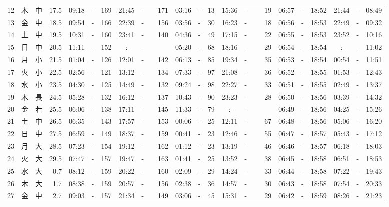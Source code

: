 \documentclass[12pt,a4j]{jsarticle}
\begin{document}
\begin{table}[htbp]
\begin{center}
{\begin{tabular}{|rc|cr|ccrccr|ccrccr|ccc|ccc|}
12 & 木 & 中 & 17.5 &  09:18 &-& 169 &  21:45 &-& 171 &  03:16 &-&  13 &  15:36 &-&  19 & 06:57 & -& 18:52 & 21:44 & -& 08:49 \\
13 & 金 & 中 & 18.5 &  09:54 &-& 166 &  22:39 &-& 156 &  03:56 &-&  30 &  16:23 &-&  18 & 06:56 & -& 18:53 & 22:49 & -& 09:32 \\
14 & 土 & 中 & 19.5 &  10:31 &-& 160 &  23:41 &-& 140 &  04:36 &-&  49 &  17:15 &-&  22 & 06:55 & -& 18:53 & 23:52 & -& 10:16 \\
15 & 日 & 中 & 20.5 &  11:11 &-& 152 &  --:-- &-&~~~~~ &  05:20 &-&  68 &  18:16 &-&  29 & 06:54 & -& 18:54 & --:-- & -& 11:02 \\
16 & 月 & 小 & 21.5 &  01:04 &-& 126 &  12:01 &-& 142 &  06:13 &-&  85 &  19:34 &-&  35 & 06:53 & -& 18:54 & 00:54 & -& 11:51 \\
17 & 火 & 小 & 22.5 &  02:56 &-& 121 &  13:12 &-& 134 &  07:33 &-&  97 &  21:08 &-&  36 & 06:52 & -& 18:55 & 01:53 & -& 12:43 \\
18 & 水 & 小 & 23.5 &  04:30 &-& 125 &  14:49 &-& 132 &  09:24 &-&  98 &  22:27 &-&  33 & 06:51 & -& 18:55 & 02:49 & -& 13:37 \\
19 & 木 & 長 & 24.5 &  05:28 &-& 132 &  16:12 &-& 137 &  10:43 &-&  90 &  23:23 &-&  28 & 06:50 & -& 18:56 & 03:39 & -& 14:32 \\
20 & 金 & 若 & 25.5 &  06:06 &-& 138 &  17:11 &-& 145 &  11:33 &-&  79 &  --:-- &-&~~~~~ & 06:49 & -& 18:56 & 04:25 & -& 15:26 \\
21 & 土 & 中 & 26.5 &  06:35 &-& 143 &  17:57 &-& 153 &  00:06 &-&  25 &  12:11 &-&  67 & 06:48 & -& 18:56 & 05:06 & -& 16:20 \\
22 & 日 & 中 & 27.5 &  06:59 &-& 149 &  18:37 &-& 159 &  00:41 &-&  23 &  12:46 &-&  55 & 06:47 & -& 18:57 & 05:43 & -& 17:12 \\
23 & 月 & 大 & 28.5 &  07:23 &-& 154 &  19:12 &-& 162 &  01:12 &-&  23 &  13:19 &-&  46 & 06:46 & -& 18:57 & 06:18 & -& 18:03 \\
24 & 火 & 大 & 29.5 &  07:47 &-& 157 &  19:47 &-& 163 &  01:41 &-&  25 &  13:52 &-&  38 & 06:45 & -& 18:58 & 06:51 & -& 18:53 \\
25 & 水 & 大 &  0.7 &  08:12 &-& 159 &  20:22 &-& 160 &  02:09 &-&  29 &  14:24 &-&  33 & 06:44 & -& 18:58 & 07:22 & -& 19:43 \\
26 & 木 & 大 &  1.7 &  08:38 &-& 159 &  20:57 &-& 156 &  02:38 &-&  36 &  14:57 &-&  30 & 06:43 & -& 18:58 & 07:54 & -& 20:33 \\
27 & 金 & 中 &  2.7 &  09:03 &-& 157 &  21:34 &-& 149 &  03:06 &-&  45 &  15:31 &-&  29 & 06:42 & -& 18:59 & 08:26 & -& 21:23 \\

\end{tabular}}
\end{center}
\end{table}
\end{document}
